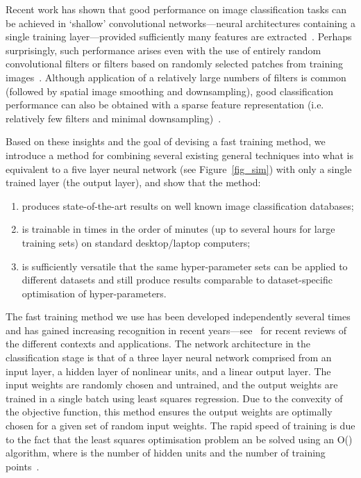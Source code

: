 \documentclass[conference]{IEEEtran}
\begin{document}
Recent work has shown that good performance on image classification tasks can be achieved in `shallow' convolutional networks---neural architectures containing a single training layer---provided sufficiently many features are extracted~\cite{Coates.11}. Perhaps surprisingly, such performance arises even with the use of entirely random convolutional filters or filters based on randomly selected patches from training images~\cite{Coates.11a}. Although application of a relatively large numbers of filters is common (followed by spatial image smoothing and downsampling), good classification performance can also be obtained with a sparse feature representation (i.e. relatively few filters and minimal downsampling)~\cite{Le.10}.

Based on these insights and the goal of devising a fast training method, we introduce a method for combining several existing general techniques into what is equivalent to a five layer neural network (see Figure~\ref{fig_sim}) with only a single trained layer (the output layer), and show that the method:
\begin{enumerate}
\item produces state-of-the-art results on  well known image classification databases;
\item is trainable in times in the order of minutes (up to several hours for large training sets) on standard desktop/laptop  computers;
\item is sufficiently versatile that the same hyper-parameter sets can be applied to different datasets and still produce results comparable to dataset-specific optimisation of hyper-parameters.
\end{enumerate}

The fast training method  we use has been developed independently several times~\cite{Schmidt.92,Chen.96,Eliasmith,Huang.04} and has gained increasing recognition in recent years---see~\cite{Eliasmith.12,Stewart.14a,Huang.12,Huang.14} for recent reviews of the different contexts and applications. The network architecture  in the classification stage is that of a three layer neural network comprised from an input layer, a hidden layer of nonlinear units, and a linear output layer. The input weights are randomly chosen and untrained, and the output weights are trained in a single batch using least squares regression. Due to the convexity of the objective function, this method ensures the output weights are optimally chosen for a given set of random input weights. The rapid speed of training is due to the fact that the least squares optimisation problem an be solved using an O() algorithm, where  is the number of hidden units and  the number of training points~\cite{McDonnell.15PLOS}. 
\end{document}
